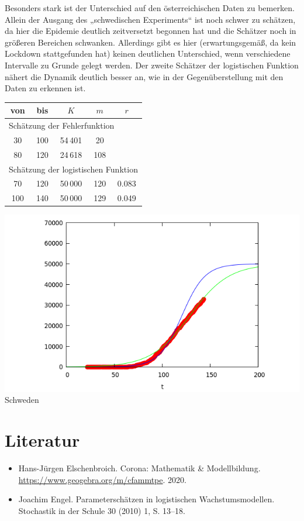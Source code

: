 \documentclass[a4paper,11pt]{article}
\begin{document}
Besonders stark ist der Unterschied auf den österreichischen Daten zu
bemerken.  Allein der Ausgang des „schwedischen Experiments“ ist noch schwer
zu schätzen, da hier die Epidemie deutlich zeitversetzt begonnen hat und die
Schätzer noch in größeren Bereichen schwanken. Allerdings gibt es hier
(erwartungsgemäß, da kein Lockdown stattgefunden hat) keinen deutlichen
Unterschied, wenn verschiedene Intervalle zu Grunde gelegt werden.  Der zweite
Schätzer der logistischen Funktion nähert die Dynamik deutlich besser an, wie
in der Gegenüberstellung mit den Daten zu erkennen ist.
\begin{center}
  \begin{tabular}{|c|c|c|c|c|}\hline
    von & bis & $K$ & $m$ & $r$ \\\hline
    \multicolumn{5}{|l|}{Schätzung der Fehlerfunktion}\\\hline
    30 & 100 & 54\,401 &  20 & \\
    80 & 120 & 24\,618 & 108 & \\\hline
    \multicolumn{5}{|l|}{Schätzung der logistischen Funktion}\\\hline
    70 & 120 & 50\,000 & 120 & 0.083 \\
   100 & 140 & 50\,000 & 129 & 0.049 \\\hline
  \end{tabular}

  \includegraphics[width=.6\textwidth]{Sweden-3.png}\\[1em] {Schweden}
\end{center}


\section{Literatur}

\begin{itemize}
\item Hans-Jürgen Elschenbroich. Corona: Mathematik \& Modellbildung.\\
  \url{https://www.geogebra.org/m/cfammtpe}.  2020.
\item Joachim Engel. Parameterschätzen in logistischen Wachstumsmodellen.
  Stochastik in der Schule 30 (2010) 1, S. 13–18.
\end{itemize}
\end{document}
